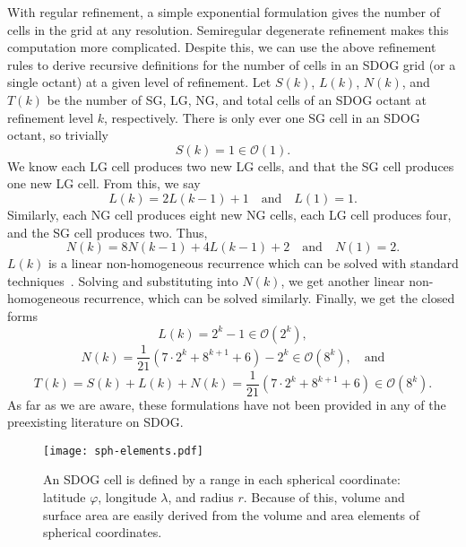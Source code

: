 With regular refinement, a simple exponential formulation gives the number of cells in the grid at any resolution.
Semiregular degenerate refinement makes this computation more complicated.
Despite this, we can use the above refinement rules to derive recursive definitions for the number of cells in an SDOG grid (or a single octant) at a given level of refinement.
Let $S(k)$, $L(k)$, $N(k)$, and $T(k)$ be the number of SG, LG, NG, and total cells of an SDOG octant at refinement level $k$, respectively.
There is only ever one SG cell in an SDOG octant, so trivially
%
\begin{equation*}
S(k) = 1 \in \mathcal{O}(1).
\end{equation*}
%
We know each LG cell produces two new LG cells, and that the SG cell produces one new LG cell.
From this, we say
%
\begin{equation*}
L(k) = 2L(k-1) + 1 \quad\text{and}\quad L(1) = 1.
\end{equation*}
%
Similarly, each NG cell produces eight new NG cells, each LG cell produces four, and the SG cell produces two.
Thus,
%
\begin{equation*}
N(k) = 8N(k-1) + 4L(k-1) + 2 \quad\text{and}\quad N(1) = 2.
\end{equation*}
%
$L(k)$ is a linear non-homogeneous recurrence which can be solved with standard techniques~\cite{bellman1963differential}.
Solving and substituting into $N(k)$, we get another linear non-homogeneous recurrence, which can be solved similarly.
Finally, we get the closed forms
%
\begin{equation*}
L(k) = 2^{k} - 1 \in \mathcal{O}(2^k),
\end{equation*}
%
\begin{equation*}
N(k) = \frac{1}{21} \left( 7 \cdot 2^{k} + 8^{k+1} + 6 \right) - 2^{k} \in \mathcal{O}(8^k), \quad\text{and}
\end{equation*}
%
\begin{equation*}
T(k) = S(k) + L(k) + N(k) = \frac{1}{21} \left( 7 \cdot 2^{k} + 8^{k+1} + 6 \right) \in \mathcal{O}(8^k).
\end{equation*}
%
As far as we are aware, these formulations have not been provided in any of the preexisting literature on SDOG.


\begin{figure}[ht!]
	\centering
	\texttt{[image: sph-elements.pdf]}
	\caption[Overview of how an SDOG cell is defined by a range of spherical coordinates]{
		An SDOG cell is defined by a range in each spherical coordinate: latitude $\varphi$, longitude $\lambda$, and radius $r$.
		Because of this, volume and surface area are easily derived from the volume and area elements of spherical coordinates.
	}
	\label{fig:sph-elements}
\end{figure}


